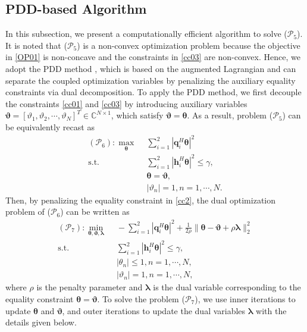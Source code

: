 \documentclass[10pt,final,doublecolumn]{IEEEtran}
\begin{document}
\subsection{PDD-based Algorithm}
In this subsection, we present a computationally efficient algorithm to solve ($\mathcal{P}_5$).
It is noted that ($\mathcal{P}_5$) is a non-convex optimization problem because the objective in \eqref{OP01} is non-concave and the constraints in \eqref{cc03} are non-convex. Hence, we adopt the PDD method \cite{shi_pen}, which is based on the augmented Lagrangian and can separate the coupled optimization variables by penalizing the auxiliary equality constraints via dual decomposition. To apply the PDD method, we first decouple the constraints \eqref{cc01}
and \eqref{cc03} by introducing auxiliary variables $\boldsymbol{\vartheta}=[\vartheta_1,\vartheta_2,\cdots,\vartheta_N]^T\in \mathbb{C}^{N\times 1}$, which satisfy $\boldsymbol{\vartheta}=\boldsymbol{\theta}$. As a result, problem ($\mathcal{P}_5$) can be equivalently recast as
\begin{subequations}
\begin{align}
(\mathcal{P}_6): \mathop{\max}\limits_{\boldsymbol{\theta}}~&~ \sum_{i=1}^{2}|\mathbf{q}_i^H
\boldsymbol{\theta}|^2 \label{OP1}\\
\text {s.t.}~&~\sum_{i=1}^{2}|{\mathbf{h}}_i^H
\boldsymbol{\theta}|^2\leq \gamma, \label{cc1}\\
~&~\boldsymbol{\theta}=\boldsymbol{\vartheta},\label{cc2}\\
~&~|{\vartheta}_n|= 1, n=1,\cdots,N. \label{cc3}
\end{align}
\end{subequations}
Then, by penalizing the equality constraint in \eqref{cc2}, the dual optimization problem of ($\mathcal{P}_6$) can be written as
\begin{subequations}
\begin{align}
(\mathcal{P}_7): \mathop{\min}\limits_{\boldsymbol{\theta},\boldsymbol{\vartheta},\boldsymbol{\lambda}}~&~ -\sum_{i=1}^{2}|\mathbf{q}_i^H
\boldsymbol{\theta}|^2+\frac{1}{2\rho}\|\boldsymbol{\theta}-\boldsymbol{\vartheta} +\rho\boldsymbol{\lambda}\|_2^2 \label{OP2}\\
\text {s.t.}~&~\sum_{i=1}^{2}|{\mathbf{h}}_i^H
\boldsymbol{\theta}|^2\leq \gamma, \label{ccc1}\\
~&~|\theta_n|\leq 1, n=1,\cdots,N, \label{ccc3}\\
~&~|{\vartheta}_n|= 1, n=1,\cdots,N, \label{ccc3}
\end{align}
\end{subequations}
where $\rho$ is the penalty parameter and $\boldsymbol{\lambda}$ is the dual variable corresponding to the equality constraint $\boldsymbol{\theta}=\boldsymbol{\vartheta}$. To solve the problem ($\mathcal{P}_7$), we use inner iterations to update $\boldsymbol{\theta}$ and $\boldsymbol{\vartheta}$, and outer iterations to update the dual variables $\boldsymbol{\lambda}$ with the details given below.
\end{document}
